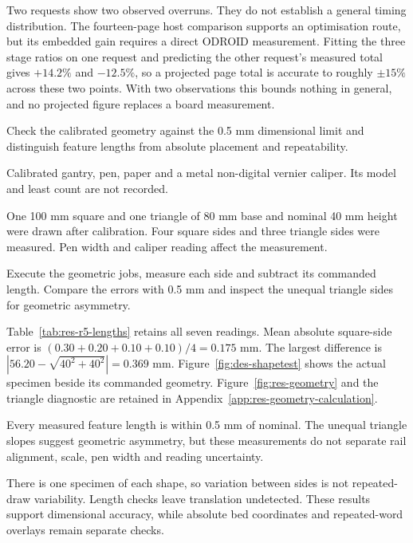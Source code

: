 Two requests show two observed overruns. They do not establish a general timing distribution. The fourteen-page host comparison supports an optimisation route, but its embedded gain requires a direct ODROID measurement. Fitting the three stage ratios on one request and predicting the other request's measured total gives $+14.2\%$ and $-12.5\%$, so a projected page total is accurate to roughly $\pm15\%$ across these two points. With two observations this bounds nothing in general, and no projected figure replaces a board measurement.

Check the calibrated geometry against the 0.5 mm dimensional limit and distinguish feature lengths from absolute placement and repeatability.

Calibrated gantry, pen, paper and a metal non-digital vernier caliper. Its model and least count are not recorded.

One 100 mm square and one triangle of 80 mm base and nominal 40 mm height were drawn after calibration. Four square sides and three triangle sides were measured. Pen width and caliper reading affect the measurement.

Execute the geometric jobs, measure each side and subtract its commanded length. Compare the errors with 0.5 mm and inspect the unequal triangle sides for geometric asymmetry.

Table~\ref{tab:res-r5-lengths} retains all seven readings. Mean absolute square-side error is $(0.30+0.20+0.10+0.10)/4=0.175$ mm. The largest difference is $|56.20-\sqrt{40^2+40^2}|=0.369$ mm. Figure~\ref{fig:des-shapetest} shows the actual specimen beside its commanded geometry. Figure~\ref{fig:res-geometry} and the triangle diagnostic are retained in Appendix~\ref{app:res-geometry-calculation}.


Every measured feature length is within 0.5 mm of nominal. The unequal triangle slopes suggest geometric asymmetry, but these measurements do not separate rail alignment, scale, pen width and reading uncertainty.

There is one specimen of each shape, so variation between sides is not repeated-draw variability. Length checks leave translation undetected. These results support dimensional accuracy, while absolute bed coordinates and repeated-word overlays remain separate checks.

